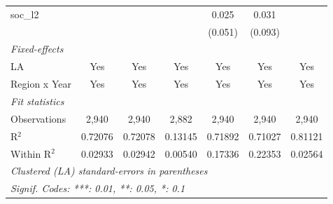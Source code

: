 \begin{table}[htbp]
\begin{tabular}{lcccccc}
      soc\_l2                                    &               &               &              & 0.025          & 0.031         &   \\   
                                                 &               &               &              & (0.051)        & (0.093)       &   \\   
      \midrule
      \emph{Fixed-effects}\\
      LA                                         & Yes           & Yes           & Yes          & Yes            & Yes           & Yes\\  
      Region x Year                              & Yes           & Yes           & Yes          & Yes            & Yes           & Yes\\  
      \midrule
      \emph{Fit statistics}\\
      Observations                               & 2,940         & 2,940         & 2,882        & 2,940          & 2,940         & 2,940\\  
      R$^2$                                      & 0.72076       & 0.72078       & 0.13145      & 0.71892        & 0.71027       & 0.81121\\  
      Within R$^2$                               & 0.02933       & 0.02942       & 0.00540      & 0.17336        & 0.22353       & 0.02564\\  
      \midrule \midrule
      \multicolumn{7}{l}{\emph{Clustered (LA) standard-errors in parentheses}}\\
      \multicolumn{7}{l}{\emph{Signif. Codes: ***: 0.01, **: 0.05, *: 0.1}}\\
   \end{tabular}
\end{table}



